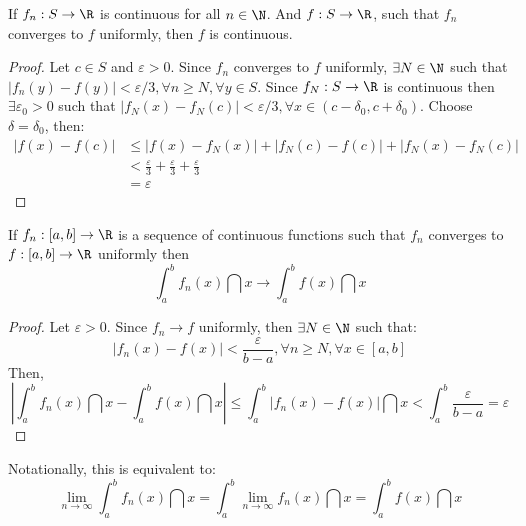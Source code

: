 \begin{theorem}
    If $f_n:S \to \R$ is continuous for all $n \in \N$. And $f: S \to \R$, such that $f_n$ converges to $f$ uniformly, then $f$ is continuous.
\end{theorem}

\begin{proof}
    Let $c \in S$ and $\varepsilon > 0$. Since $f_n$ converges to $f$ uniformly, $\exists N \in \N$ such that $|f_n(y) - f(y)| < \varepsilon/3, \forall n \geq N, \forall y \in S$. Since $f_N: S \to \R$ is continuous then $\exists \varepsilon_0 > 0$ such that $|f_N(x) - f_N(c)| < \varepsilon/3, \forall x \in (c - \delta_0, c + \delta_0)$. Choose $\delta = \delta_0$, then:
    \begin{align*}
        |f(x) - f(c)| &\leq |f(x) - f_N(x)| + |f_N(c) - f(c)| + |f_N(x) - f_N(c)| \\
        &< \frac{\varepsilon}{3} + \frac{\varepsilon}{3} + \frac{\varepsilon}{3} \\
        &= \varepsilon
    \end{align*}
\end{proof}

\begin{theorem}
    If $f_n: [a,b] \to \R$ is a sequence of continuous functions such that $f_n$ converges to $f: [a,b] \to \R$ uniformly then
    \begin{equation*}
        \int_a^b f_n(x) \dint x \to \int_a^b f(x) \dint x
    \end{equation*}
\end{theorem}

\begin{proof}
    Let $\varepsilon > 0$. Since $f_n \to f$ uniformly, then $\exists N \in \N$ such that:
    \begin{equation*}
        |f_n(x) - f(x)| < \frac{\varepsilon}{b-a}, \forall n \geq N, \forall x \in [a,b]
    \end{equation*}
    Then,
    \begin{equation*}
        \left |
            \int_a^b f_n(x) \dint x- \int_a^b f(x) \dint x 
        \right | \leq 
        \int_a^b |f_n(x) - f(x)| \dint x 
        <
        \int_a^b \frac{\varepsilon}{b-a} = \varepsilon
    \end{equation*}
\end{proof}

\begin{remark}
    Notationally, this is equivalent to:
    \begin{equation*}
        \lim \limits_{n \to \infty} \int_a^b f_n(x) \dint x = 
        \int_a^b \lim \limits_{n \to \infty} f_n(x) \dint x = 
        \int_a^b f(x) \dint x
    \end{equation*}
\end{remark}

